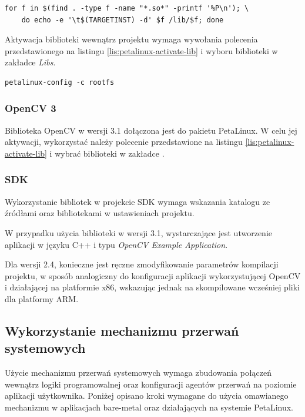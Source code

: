 \begin{lstlisting}[breaklines=true]
for f in $(find . -type f -name "*.so*" -printf '%P\n'); \
	do echo -e '\t$(TARGETINST) -d' $f /lib/$f; done
\end{lstlisting}

Aktywacja biblioteki wewnątrz projektu wymaga wywołania polecenia przedstawionego na listingu \ref{lis:petalinux-activate-lib} i wyboru biblioteki w zakładce \textit{Libs}. 

\begin{lstlisting}[caption=Dołączenie biblioteki do projektu PetaLinux., label=lis:petalinux-activate-lib]
petalinux-config -c rootfs
\end{lstlisting}


\subsubsection{OpenCV 3}
Biblioteka OpenCV w wersji 3.1 dołączona jest do pakietu PetaLinux. W celu jej aktywacji, wykorzystać należy polecenie przedstawione na listingu \ref{lis:petalinux-activate-lib} i wybrać biblioteki w zakładce .

\subsubsection{SDK}
Wykorzystanie bibliotek w projekcie SDK wymaga wskazania katalogu ze źródłami oraz bibliotekami w ustawieniach projektu.

W przypadku użycia biblioteki w wersji 3.1, wystarczające jest utworzenie aplikacji w języku C++ i typu \textit{OpenCV Example Application}.

Dla wersji 2.4, konieczne jest ręczne zmodyfikowanie parametrów kompilacji projektu, w sposób analogiczny do konfiguracji aplikacji wykorzystującej OpenCV i działającej na platformie x86, wskazując jednak na skompilowane wcześniej pliki dla platformy ARM.
\subsection{Wykorzystanie mechanizmu przerwań systemowych}
\label{sec:interrupts-config}
Użycie mechanizmu przerwań systemowych wymaga zbudowania połączeń wewnątrz logiki programowalnej oraz konfiguracji agentów przerwań na poziomie aplikacji użytkownika. Poniżej opisano kroki wymagane do użycia omawianego mechanizmu w aplikacjach bare-metal oraz działających na systemie PetaLinux.

